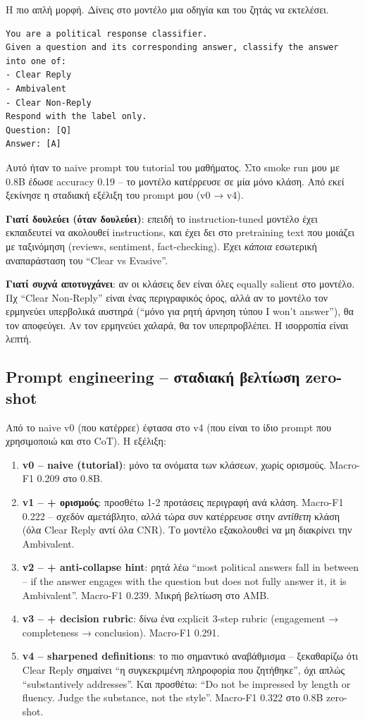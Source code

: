 \documentclass[12pt]{fphw}
\begin{document}
Η πιο απλή μορφή. Δίνεις στο μοντέλο μια οδηγία και του ζητάς να εκτελέσει.

\begin{verbatim}
You are a political response classifier.
Given a question and its corresponding answer, classify the answer
into one of:
- Clear Reply
- Ambivalent
- Clear Non-Reply
Respond with the label only.
Question: [Q]
Answer: [A]
\end{verbatim}

Αυτό ήταν το naive prompt του tutorial του μαθήματος. Στο smoke run μου με 0.8B έδωσε accuracy 0.19 -- το μοντέλο κατέρρευσε σε μία μόνο κλάση. Από εκεί ξεκίνησε η σταδιακή εξέλιξη του prompt μου (v0 → v4).

\textbf{Γιατί δουλεύει (όταν δουλεύει)}: επειδή το instruction-tuned μοντέλο έχει εκπαιδευτεί να ακολουθεί instructions, και έχει δει στο pretraining text που μοιάζει με ταξινόμηση (reviews, sentiment, fact-checking). Έχει \emph{κάποια} εσωτερική αναπαράσταση του ``Clear vs Evasive''.

\textbf{Γιατί συχνά αποτυγχάνει}: αν οι κλάσεις δεν είναι όλες equally salient στο μοντέλο. Πχ ``Clear Non-Reply'' είναι ένας περιγραφικός όρος, αλλά αν το μοντέλο τον ερμηνεύει υπερβολικά αυστηρά (``μόνο για ρητή άρνηση τύπου I won't answer''), θα τον αποφεύγει. Αν τον ερμηνεύει χαλαρά, θα τον υπερπροβλέπει. Η ισορροπία είναι λεπτή.

\subsection{Prompt engineering -- σταδιακή βελτίωση zero-shot}

Από το naive v0 (που κατέρρεε) έφτασα στο v4 (που είναι το ίδιο prompt που χρησιμοποιώ και στο CoT). Η εξέλιξη:

\begin{enumerate}
    \item \textbf{v0 -- naive (tutorial)}: μόνο τα ονόματα των κλάσεων, χωρίς ορισμούς. Macro-F1 0.209 στο 0.8B.
    \item \textbf{v1 -- + ορισμούς}: προσθέτω 1-2 προτάσεις περιγραφή ανά κλάση. Macro-F1 0.222 -- σχεδόν αμετάβλητο, αλλά τώρα συν κατέρρευσε στην \emph{αντίθετη} κλάση (όλα Clear Reply αντί όλα CNR). Το μοντέλο εξακολουθεί να μη διακρίνει την Ambivalent.
    \item \textbf{v2 -- + anti-collapse hint}: ρητά λέω ``most political answers fall in between -- if the answer engages with the question but does not fully answer it, it is Ambivalent''. Macro-F1 0.239. Μικρή βελτίωση στο AMB.
    \item \textbf{v3 -- + decision rubric}: δίνω ένα explicit 3-step rubric (engagement → completeness → conclusion). Macro-F1 0.291.
    \item \textbf{v4 -- sharpened definitions}: το πιο σημαντικό αναβάθμισμα -- ξεκαθαρίζω ότι Clear Reply σημαίνει ``η συγκεκριμένη πληροφορία που ζητήθηκε'', όχι απλώς ``substantively addresses''. Και προσθέτω: ``Do not be impressed by length or fluency. Judge the substance, not the style''. Macro-F1 0.322 στο 0.8B zero-shot.
\end{enumerate}
\end{document}
